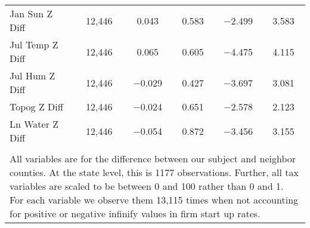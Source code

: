 \begin{table}[!htbp]
\begin{tabular}{@{\extracolsep{5pt}}lccccc}
Jan Sun Z Diff & 12,446 & 0.043 & 0.583 & $-$2.499 & 3.583 \\ 
Jul Temp Z Diff & 12,446 & 0.065 & 0.605 & $-$4.475 & 4.115 \\ 
Jul Hum Z Diff & 12,446 & $-$0.029 & 0.427 & $-$3.697 & 3.081 \\ 
Topog Z Diff & 12,446 & $-$0.024 & 0.651 & $-$2.578 & 2.123 \\ 
Ln Water Z Diff & 12,446 & $-$0.054 & 0.872 & $-$3.456 & 3.155 \\ 
\hline \\[-1.8ex] 
\multicolumn{6}{l}{All variables are for the difference between our subject and neighbor counties. At the state level, this is 1177 observations. Further, all tax variables are scaled to be between 0 and 100 rather than 0 and 1. For each variable we observe them 13,115 times when not accounting for positive or negative infinify values in firm start up rates.} \\ 
\end{tabular} 
\end{table} 
